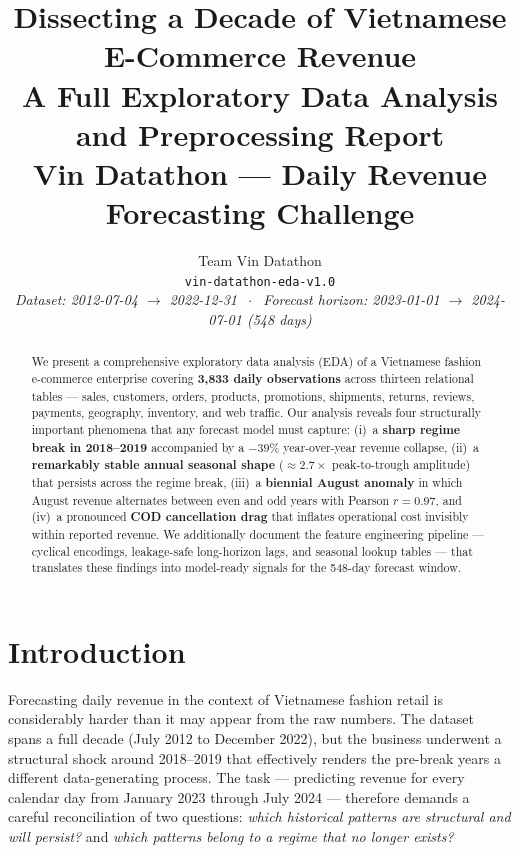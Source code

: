 \documentclass{article}
\title{%
  \textbf{Dissecting a Decade of Vietnamese E-Commerce Revenue}\\[4pt]
  {\large A Full Exploratory Data Analysis and Preprocessing Report}\\[2pt]
  {\normalsize Vin Datathon — Daily Revenue Forecasting Challenge}
}
\author{%
  Team Vin Datathon\\
  \texttt{vin-datathon-eda-v1.0}\\[2pt]
  \small\textit{Dataset: 2012-07-04 $\to$ 2022-12-31 $\;\cdot\;$
  Forecast horizon: 2023-01-01 $\to$ 2024-07-01 (548 days)}
}
\begin{document}
\maketitle

\begin{abstract}
We present a comprehensive exploratory data analysis (EDA) of a Vietnamese fashion
e-commerce enterprise covering \textbf{3,833 daily observations} across thirteen
relational tables — sales, customers, orders, products, promotions, shipments,
returns, reviews, payments, geography, inventory, and web traffic.
Our analysis reveals four structurally important phenomena that any forecast
model must capture: (i)~a \textbf{sharp regime break in 2018--2019} accompanied
by a $-39\%$ year-over-year revenue collapse, (ii)~a \textbf{remarkably stable
annual seasonal shape} ($\approx2.7\times$ peak-to-trough amplitude) that
persists across the regime break, (iii)~a \textbf{biennial August anomaly} in
which August revenue alternates between even and odd years with Pearson
$r = 0.97$, and (iv)~a pronounced \textbf{COD cancellation drag} that inflates
operational cost invisibly within reported revenue.
We additionally document the feature engineering pipeline — cyclical encodings,
leakage-safe long-horizon lags, and seasonal lookup tables — that translates
these findings into model-ready signals for the 548-day forecast window.
\end{abstract}

\section{Introduction}
\label{sec:intro}

Forecasting daily revenue in the context of Vietnamese fashion retail is
considerably harder than it may appear from the raw numbers.
The dataset spans a full decade (July 2012 to December 2022), but the business
underwent a structural shock around 2018--2019 that effectively renders the
pre-break years a different data-generating process.
The task — predicting revenue for every calendar day from January 2023 through
July 2024 — therefore demands a careful reconciliation of two questions:
\textit{which historical patterns are structural and will persist?} and
\textit{which patterns belong to a regime that no longer exists?}
\end{document}
